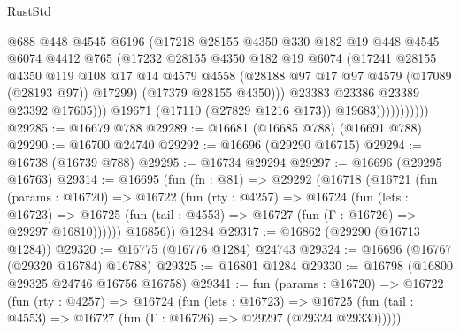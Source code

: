 \begin{lexlean}{RustStd}
\begin{coremodule}
                              @688
                              @448
                              @4545
                              @6196
                              (@17218
                                @28155
                                @4350
                                @330
                                @182
                                @19
                                @448
                                @4545
                                @6074
                                @4412
                                @765
                                (@17232
                                  @28155
                                  @4350
                                  @182
                                  @19
                                  @6074
                                  (@17241
                                    @28155
                                    @4350
                                    @119
                                    @108
                                    @17
                                    @14
                                    @4579
                                    @4558
                                    (@28188 @97 @17 @97 @4579 (@17089 (@28193 @97)) @17299)
                                    (@17379 @28155 @4350)))
                                @23383
                                @23386
                                @23389
                                @23392
                                @17605)))
                          @19671
                          (@17110 (@27829 @1216 @173))
                          @19683)))))))))))
@29285 := @16679 @788
@29289 := @16681 (@16685 @788) (@16691 @788)
@29290 := @16700 @24740
@29292 := @16696 (@29290 @16715)
@29294 := @16738 (@16739 @788)
@29295 := @16734 @29294
@29297 := @16696 (@29295 @16763)
@29314 := @16695
    (fun (fn : @81) =>
    @29292
      (@16718
        (@16721
          (fun (params : @16720) =>
          @16722
            (fun (rty : @4257) =>
            @16724
              (fun (lets : @16723) =>
              @16725 (fun (tail : @4553) => @16727 (fun (Γ : @16726) => @29297 @16810))))))
        @16856))
    @1284
@29317 := @16862 (@29290 (@16713 @1284))
@29320 := @16775 (@16776 @1284) @24743
@29324 := @16696 (@16767 (@29320 @16784) @16788)
@29325 := @16801 @1284
@29330 := @16798 (@16800 @29325 @24746 @16756 @16758)
@29341 := fun (params : @16720) =>
  @16722
    (fun (rty : @4257) =>
    @16724
      (fun (lets : @16723) =>
      @16725 (fun (tail : @4553) => @16727 (fun (Γ : @16726) => @29297 (@29324 @29330)))))

\end{coremodule}
\end{lexlean}
